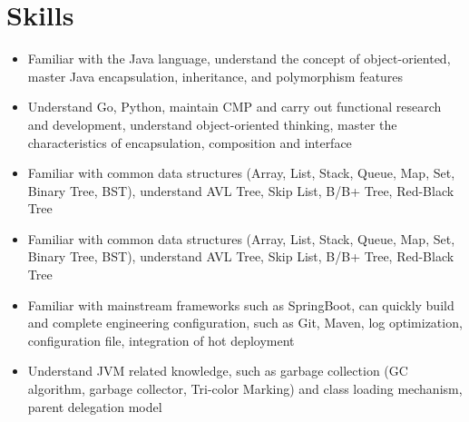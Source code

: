 \documentclass{resume}
\newcommand{\en}[1]{#1}
\newcommand{\zh}[1]{}
\begin{document}
\section{\en{Skills}\zh{技能}}
\begin{itemize}[parsep=0.25ex]
      \item \en{Familiar with the Java language, understand the concept of object-oriented, master Java encapsulation, inheritance, and polymorphism features}
            \zh{熟悉Java语言，理解面向对象思想，掌握 Java 封装、继承和多态特性}

      \item \en{Understand Go, Python, maintain CMP and carry out functional research and development, understand object-oriented thinking, master the characteristics of encapsulation, composition and interface}
            \zh{了解Go、Python，维护CMP并进行了功能研发，理解面向对象思想，掌握封装、组合和接口的特性}

      \item \en{Familiar with common data structures (Array, List, Stack, Queue, Map, Set, Binary Tree, BST),
                  understand AVL Tree, Skip List, B/B+ Tree, Red-Black Tree}
            \zh{熟悉常见集合（List、Set、Map）、多线程并发（读写锁、阻塞队列、线程池、ConcurrentHashMap等），了解悲观、乐观并发控制以及MVCC等并发控制机制}

      \item \en{Familiar with common data structures (Array, List, Stack, Queue, Map, Set, Binary Tree, BST),
                  understand AVL Tree, Skip List, B/B+ Tree, Red-Black Tree}
            \zh{熟悉常用数据结构（Array、List、Stack、Queue、Map、Set、Binary Tree、BST），
                  了解AVL树、跳表、B/B+树、Red-Black Tree}

      \item \en{Familiar with mainstream frameworks such as SpringBoot, can quickly build and complete engineering configuration, such as Git, Maven, log optimization, configuration file, integration of hot deployment}
            \zh{熟悉SpringBoot等主流框架，可以快速构建并完成工程配置，如Git，Maven，日志优化，配置文件，集成热部署}

      \item \en{Understand JVM related knowledge, such as garbage collection (GC algorithm, garbage collector, Tri-color Marking) and class loading mechanism, parent delegation model}
            \zh{了解JVM相关知识，如垃圾回收（GC算法、垃圾收集器、三色标记）和类加载机制、双亲委派机制}


\end{itemize}
\end{document}
